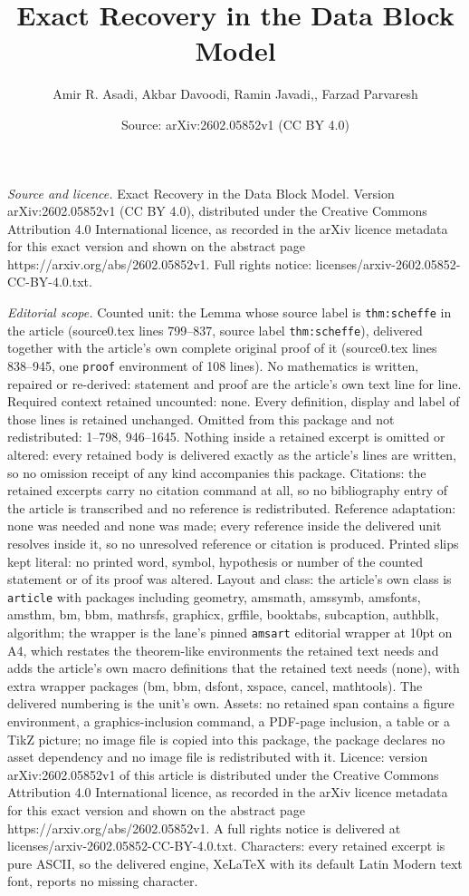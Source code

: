 \documentclass[10pt,a4paper]{amsart}
\title[Exact Recovery in the Data Block Model]{Exact Recovery in the Data Block Model}
\author{Amir R. Asadi, Akbar Davoodi, Ramin Javadi,, Farzad Parvaresh}
\date{Source: arXiv:2602.05852v1 (CC BY 4.0)}
\begin{document}
\maketitle

\noindent\emph{Source and licence.} Exact Recovery in the Data Block Model. Version arXiv:2602.05852v1 (CC BY 4.0), distributed under the Creative Commons Attribution 4.0 International licence, as recorded in the arXiv licence metadata for this exact version and shown on the abstract page https://arxiv.org/abs/2602.05852v1. Full rights notice: licenses/arxiv-2602.05852-CC-BY-4.0.txt.\par\smallskip

\noindent\textit{Editorial scope.} Counted unit: the Lemma whose source label is \texttt{thm:scheffe} in the article (source0.tex lines 799--837, source label \texttt{thm:scheffe}), delivered together with the article's own complete original proof of it (source0.tex lines 838--945, one \texttt{proof} environment of 108 lines). No mathematics is written, repaired or re-derived: statement and proof are the article's own text line for line. Required context retained uncounted: none. Every definition, display and label of those lines is retained unchanged. Omitted from this package and not redistributed: 1--798, 946--1645. Nothing inside a retained excerpt is omitted or altered: every retained body is delivered exactly as the article's lines are written, so no omission receipt of any kind accompanies this package. Citations: the retained excerpts carry no citation command at all, so no bibliography entry of the article is transcribed and no reference is redistributed. Reference adaptation: none was needed and none was made; every reference inside the delivered unit resolves inside it, so no unresolved reference or citation is produced. Printed slips kept literal: no printed word, symbol, hypothesis or number of the counted statement or of its proof was altered. Layout and class: the article's own class is \texttt{article} with packages including geometry, amsmath, amssymb, amsfonts, amsthm, bm, bbm, mathrsfs, graphicx, grffile, booktabs, subcaption, authblk, algorithm; the wrapper is the lane's pinned \texttt{amsart} editorial wrapper at 10pt on A4, which restates the theorem-like environments the retained text needs and adds the article's own macro definitions that the retained text needs (none), with extra wrapper packages (bm, bbm, dsfont, xspace, cancel, mathtools). The delivered numbering is the unit's own. Assets: no retained span contains a figure environment, a graphics-inclusion command, a PDF-page inclusion, a table or a TikZ picture; no image file is copied into this package, the package declares no asset dependency and no image file is redistributed with it. Licence: version arXiv:2602.05852v1 of this article is distributed under the Creative Commons Attribution 4.0 International licence, as recorded in the arXiv licence metadata for this exact version and shown on the abstract page https://arxiv.org/abs/2602.05852v1. A full rights notice is delivered at licenses/arxiv-2602.05852-CC-BY-4.0.txt. Characters: every retained excerpt is pure ASCII, so the delivered engine, XeLaTeX with its default Latin Modern text font, reports no missing character.
\end{document}
